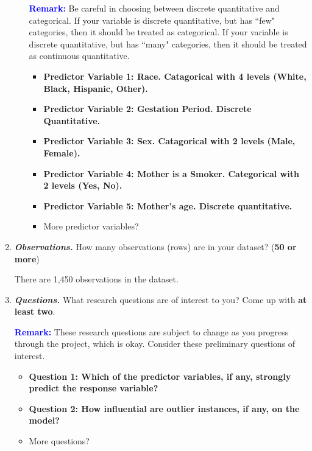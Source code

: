 \documentclass{article}\usepackage[]{graphicx}\usepackage[]{xcolor}
\begin{document}
\begin{enumerate}[1.]
\begin{enumerate}[(a)]
	\textbf{\textcolor{blue}{Remark:}} Be careful in choosing between discrete quantitative and categorical. If your variable is discrete quantitative, but has ``few" categories, then it should be treated as categorical. If your variable is discrete quantitative, but has ``many" categories, then it should be treated as continuous quantitative. 
	\begin{itemize}
		\vspace{.2cm}
		\item \textbf{Predictor Variable 1: Race. Catagorical with 4 levels (White, Black, Hispanic, Other).}
		\vspace{.2cm}
		\item \textbf{Predictor Variable 2: Gestation Period. Discrete Quantitative.}
		\vspace{.2cm}
		\item \textbf{Predictor Variable 3: Sex. Catagorical with 2 levels (Male, Female).}
		\vspace{.2cm}
		\item \textbf{Predictor Variable 4: Mother is a Smoker. Categorical with 2 levels (Yes, No).}
		\vspace{.2cm}
		\item \textbf{Predictor Variable 5: Mother's age. Discrete quantitative.}
		\vspace{.2cm}
		\item More predictor variables? 
	\end{itemize}
\end{enumerate}
		\vspace{.2cm}
		
\item \textbf{\textit{Observations.}} How many observations (rows) are in your dataset? (\textbf{50 or more})

There are 1,450 observations in the dataset.


\vspace{.2cm}
\item \textbf{\textit{Questions.}} What research questions are of interest to you? Come up with \textbf{at least two}.

\textbf{\textcolor{blue}{Remark:}} These research questions are subject to change as you progress through the project, which is okay. Consider these preliminary questions of interest. 
	\vspace{.2cm}

\begin{itemize}
	\item \textbf{Question 1: Which of the predictor variables, if any, strongly predict the response variable?}
	\vspace{.2cm}
	\item \textbf{Question 2: How influential are outlier instances, if any, on the model?}
	\vspace{.2cm}
	\item More questions? 
\end{itemize}
\end{enumerate}
\end{document}
